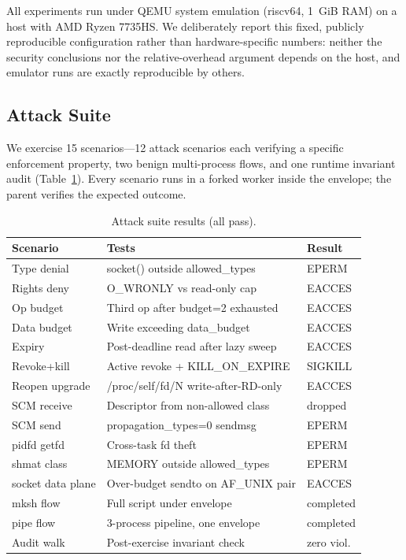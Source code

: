 \documentclass[letterpaper,twocolumn,10pt]{article}
\begin{document}
All experiments run under QEMU system emulation (riscv64, 1~GiB RAM)
on a host with AMD Ryzen 7735HS.  We deliberately report this fixed,
publicly reproducible configuration rather than hardware-specific
numbers: neither the security conclusions nor the relative-overhead
argument depends on the host, and emulator runs are exactly
reproducible by others.

\subsection{Attack Suite}

We exercise 15 scenarios---12 attack scenarios each verifying a specific
enforcement property, two benign multi-process flows, and one runtime
invariant audit (Table~\ref{tab:attacks}).  Every scenario runs
in a forked worker inside the envelope; the parent verifies the
expected outcome.

\begin{table}[t]
\centering
\caption{Attack suite results (all pass).}
\label{tab:attacks}
\small
\begin{tabular}{lp{4.2cm}l}
\toprule
\textbf{Scenario} & \textbf{Tests} & \textbf{Result} \\
\midrule
Type denial & socket() outside allowed\_types & EPERM \\
Rights deny & O\_WRONLY vs read-only cap & EACCES \\
Op budget & Third op after budget=2 exhausted & EACCES \\
Data budget & Write exceeding data\_budget & EACCES \\
Expiry & Post-deadline read after lazy sweep & EACCES \\
Revoke+kill & Active revoke + KILL\_ON\_EXPIRE & SIGKILL \\
Reopen upgrade & /proc/self/fd/N write-after-RD-only & EACCES \\
SCM receive & Descriptor from non-allowed class & dropped \\
SCM send & propagation\_types=0 sendmsg & EPERM \\
pidfd getfd & Cross-task fd theft & EPERM \\
shmat class & MEMORY outside allowed\_types & EPERM \\
socket data plane & Over-budget sendto on AF\_UNIX pair & EACCES \\
mksh flow & Full script under envelope & completed \\
pipe flow & 3-process pipeline, one envelope & completed \\
Audit walk & Post-exercise invariant check & zero viol. \\
\bottomrule
\end{tabular}
\end{table}
\end{document}
